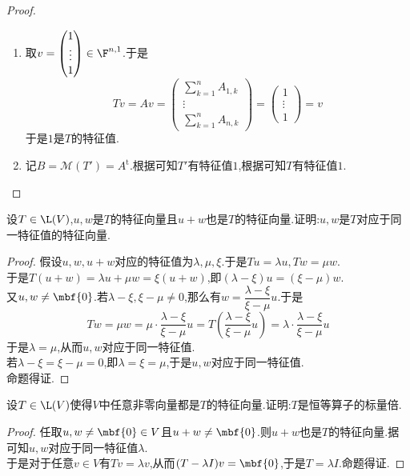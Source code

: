 \documentclass{ctexart}
\begin{document}
\begin{proof}
    \begin{enumerate}[label=\tbf{(\arabic*)}]
        \item 取$v=\begin{pmatrix}1\\\vdots\\1\end{pmatrix}\in\F^{n,1}$.于是
            \[Tv=Av=\begin{pmatrix}
                \displaystyle\sum_{k=1}^{n}A_{1,k}\\
                \vdots\\
                \displaystyle\sum_{k=1}^{n}A_{n,k}
            \end{pmatrix}
            =\begin{pmatrix}
                1\\\vdots\\1
            \end{pmatrix}
            =v\]
            于是$1$是$T$的特征值.
        \item 记$B=\mathcal{M}(T')=A^\text{t}$.根据可知$T'$有特征值$1$,根据可知$T$有特征值$1$.
    \end{enumerate}
\end{proof}
\begin{problem}[25.]
    设$T\in\L(V)$,$u,w$是$T$的特征向量且$u+w$也是$T$的特征向量.证明:$u,w$是$T$对应于同一特征值的特征向量.
\end{problem}
\begin{proof}
    假设$u,w,u+w$对应的特征值为$\lambda,\mu,\xi$.于是$Tu=\lambda u,Tw=\mu w$.\\
    于是$T(u+w)=\lambda u+\mu w=\xi(u+w)$,即$(\lambda-\xi)u=(\xi-\mu)w$.\\
    又$u,w\neq\mbf{0}$.若$\lambda-\xi,\xi-\mu\neq0$,那么有$w=\dfrac{\lambda-\xi}{\xi-\mu}u$.于是
    $$Tw=\mu w=\mu\cdot\dfrac{\lambda-\xi}{\xi-\mu}u=T\left(\dfrac{\lambda-\xi}{\xi-\mu}u\right)=\lambda\cdot\dfrac{\lambda-\xi}{\xi-\mu}u$$
    于是$\lambda=\mu$,从而$u,w$对应于同一特征值.\\
    若$\lambda-\xi=\xi-\mu=0$,即$\lambda=\xi=\mu$,于是$u,w$对应于同一特征值.\\
    命题得证.
\end{proof}
\begin{problem}[26.]
    设$T\in\L(V)$使得$V$中任意非零向量都是$T$的特征向量.证明:$T$是恒等算子的标量倍.
\end{problem}
\begin{proof}
    任取$u,w\neq\mbf{0}\in V$且$u+w\neq\mbf{0}$.则$u+w$也是$T$的特征向量.据可知$u,w$对应于同一特征值$\lambda$.\\
    于是对于任意$v\in V$有$Tv=\lambda v$,从而$(T-\lambda I)v=\mbf{0}$,于是$T=\lambda I$.命题得证.
\end{proof}
\end{document}
